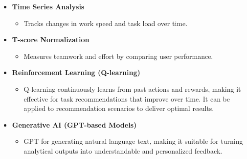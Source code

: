 \begin{itemize}
\begin{itemize}
            \item \textbf{Time Series Analysis}  
            \begin{itemize}
                \item Tracks changes in work speed and task load over time.
            \end{itemize}

            \item \textbf{T-score Normalization}  
            \begin{itemize}
                \item Measures teamwork and effort by comparing user performance.
            \end{itemize}

            \item \textbf{Reinforcement Learning (Q-learning)}  
            \begin{itemize}
                \item Q-learning continuously learns from past actions and rewards, making it effective for task recommendations that improve over time. It can be applied to recommendation scenarios to deliver optimal results.
            \end{itemize}

            \item \textbf{Generative AI (GPT-based Models)}  
            \begin{itemize}
                \item GPT for generating natural language text, making it suitable for turning analytical outputs into understandable and personalized feedback.
            \end{itemize}
        \end{itemize}


\end{itemize}
